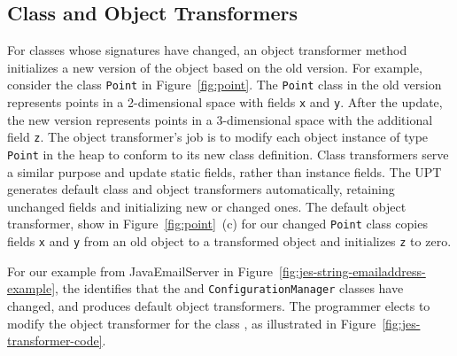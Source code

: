 \subsection{Class and Object Transformers}
\label{subsec:transformers}

For classes whose signatures have changed, an object
transformer method  initializes a new version of
the object based on the old version. For example, consider the class
{\tt Point} in Figure~\ref{fig:point}. The {\tt Point} class in the old
version represents points in a 2-dimensional space with fields {\tt x} and
{\tt y}. After the update, the new version represents points in a
3-dimensional space with the additional field {\tt z}. The object transformer's
job is to modify each object instance of type {\tt Point} in the heap to conform to its
new class definition. Class transformers serve a similar purpose and update
static fields, rather than instance fields.  The \ac{UPT} generates default
class and object transformers automatically, retaining unchanged fields and
initializing new or changed ones.  The default object transformer, show in
Figure~\ref{fig:point}~(c)  for our changed \texttt{Point} class copies
fields {\tt x} and {\tt y} from an old object to a transformed object and
initializes {\tt z} to zero.






For our example from JavaEmailServer in
Figure~\ref{fig:jes-string-emailaddress-example}, the \UPT identifies that
the \User and {\tt ConfigurationManager} classes have changed, and produces
default object transformers.  The programmer elects to modify the object
transformer for the class \User, as illustrated in
Figure~\ref{fig:jes-transformer-code}.
  

